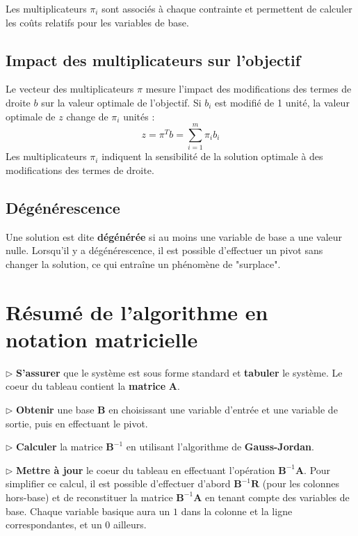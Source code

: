\documentclass{report}
\begin{document}
\begin{multicols*}{2}
Les multiplicateurs \( \pi_i \) sont associés à chaque contrainte et permettent de
calculer les coûts relatifs pour les variables de base.

\subsection{Impact des multiplicateurs sur l'objectif}

Le vecteur des multiplicateurs \( \pi \) mesure l'impact des modifications des termes
de droite \( b \) sur la valeur optimale de l'objectif. Si \( b_i \) est modifié de 1
unité, la valeur optimale de \( z \) change de \( \pi_i \) unités :
\[
z = \pi^T b = \sum_{i=1}^{m} \pi_i b_i
\]
Les multiplicateurs \( \pi_i \) indiquent la sensibilité de la solution optimale à
des modifications des termes de droite.

\subsection{Dégénérescence}

Une solution est dite \textbf{dégénérée} si au moins une variable de base a une
valeur nulle. Lorsqu'il y a dégénérescence, il est possible d'effectuer un pivot
sans changer la solution, ce qui entraîne un phénomène de "surplace".


\section{Résumé de l'algorithme en notation matricielle}
\noindent
$\rhd$
\textbf{S'assurer} que le système est sous forme standard et 
\textbf{tabuler} le système. Le coeur du tableau contient 
la \textbf{matrice} \( \mathbf{A} \). 

\noindent
$\rhd$
\textbf{Obtenir} une base \( \mathbf{B} \) en choisissant 
une variable d'entrée et une variable de sortie, puis en effectuant 
le pivot. 

\noindent
$\rhd$
\textbf{Calculer} la matrice \( \mathbf{B}^{-1} \) en utilisant 
l'algorithme de \textbf{Gauss-Jordan}.  

\noindent
$\rhd$
\textbf{Mettre à jour} le coeur du tableau en effectuant 
l'opération \( \mathbf{B}^{-1} \mathbf{A} \). Pour simplifier ce calcul, 
il est possible d'effectuer d'abord \( \mathbf{B}^{-1} \mathbf{R} \) 
(pour les colonnes hors-base) et de reconstituer la matrice \( \mathbf{B}^{-1} \mathbf{A} \) en tenant compte des variables de base. Chaque variable basique 
aura un \(1\) dans la colonne et la ligne correspondantes, et un \(0\) ailleurs.


\end{multicols*}
\end{document}
